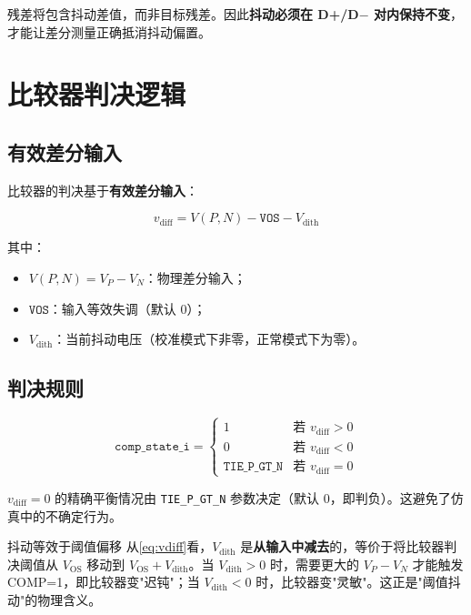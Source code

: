 \documentclass[UTF8,a4paper,11pt]{ctexart}
\newcommand{\Vdith}{V_{\mathrm{dith}}}
\newcommand{\vdiff}{v_{\mathrm{diff}}}
\newcommand{\code}[1]{\texttt{#1}}
\begin{document}
残差将包含抖动差值，而非目标残差。因此\textbf{抖动必须在 D+/D$-$ 对内保持不变}，才能让差分测量正确抵消抖动偏置。

\section{比较器判决逻辑}

\subsection{有效差分输入}

比较器的判决基于\textbf{有效差分输入}：

\begin{equation}
\boxed{
\vdiff = V(P, N) - \code{VOS} - \Vdith
}
\label{eq:vdiff}
\end{equation}

其中：
\begin{itemize}[leftmargin=2em]
    \item $V(P, N) = V_P - V_N$：物理差分输入；
    \item $\code{VOS}$：输入等效失调（默认 0）；
    \item $\Vdith$：当前抖动电压（校准模式下非零，正常模式下为零）。
\end{itemize}

\subsection{判决规则}

\begin{equation}
\code{comp\_state\_i} = \begin{cases}
1 & \text{若 } \vdiff > 0 \\
0 & \text{若 } \vdiff < 0 \\
\code{TIE\_P\_GT\_N} & \text{若 } \vdiff = 0
\end{cases}
\label{eq:decision}
\end{equation}

$\vdiff = 0$ 的精确平衡情况由 \code{TIE\_P\_GT\_N} 参数决定（默认 0，即判负）。这避免了仿真中的不确定行为。

\begin{tipbox}{抖动等效于阈值偏移}
从\cref{eq:vdiff}看，$\Vdith$ 是\textbf{从输入中减去}的，等价于将比较器判决阈值从 $V_{\mathrm{OS}}$ 移动到 $V_{\mathrm{OS}} + \Vdith$。当 $\Vdith > 0$ 时，需要更大的 $V_P - V_N$ 才能触发 COMP=1，即比较器变"迟钝"；当 $\Vdith < 0$ 时，比较器变"灵敏"。这正是"阈值抖动"的物理含义。
\end{tipbox}
\end{document}
